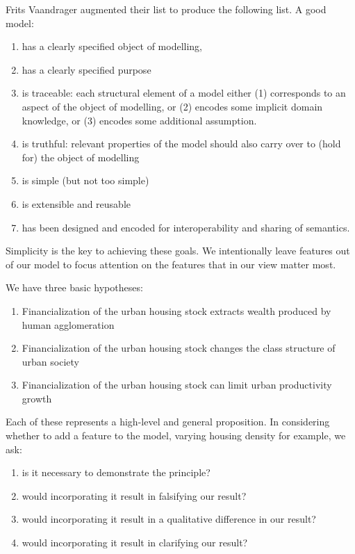 Frits Vaandrager \cite{} %
augmented their list to produce the following list. A good model: \begin{enumerate}
     \item has a clearly specified object of modelling,
     \item  has a clearly specified purpose
     \item is traceable: each structural element of a model either (1) corresponds to an aspect of the object of modelling, or (2) encodes some implicit domain knowledge, or (3) encodes some additional assumption.
     \item  is truthful: relevant properties of the model should also carry over to (hold for) the object of modelling
     \item is simple (but not too simple)
     \item is extensible and reusable
     \item has been designed and encoded for interoperability and sharing of semantics.
 \end{enumerate}

Simplicity is the key to achieving these goals. %
We intentionally leave features out of  our model to focus attention on the features that in our view matter most. 


We have three basic hypotheses:
\begin{enumerate}
    \item Financialization of the urban housing stock extracts wealth produced by human agglomeration 
    \item Financialization of the urban housing stock changes the class structure of urban society
    \item Financialization of the urban housing stock can limit urban productivity growth
\end{enumerate}
Each  of these represents a high-level and general proposition. In considering whether to add a feature to the model, varying housing density for example, we ask: 
\begin{enumerate}
    \item is it necessary to demonstrate the principle? 
    \item would incorporating it result in falsifying our result?
    \item would incorporating it result in a qualitative difference in our result?
    \item would incorporating it result in clarifying our result?
\end{enumerate}

